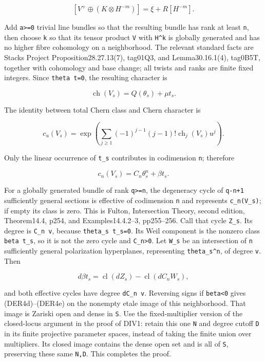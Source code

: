 \documentclass[11pt,a4paper]{article}
\theoremstyle{definition}
\begin{document}
\[
 [V^+\oplus (K\otimes H^{-m})]
 =\xi+R[H^{-m}].
\]

Add \texttt{a\textgreater{}=0} trivial line bundles so that the
resulting bundle has rank at least \texttt{n}, then choose \texttt{k} so
that its tensor product \texttt{V} with \texttt{H\^{}k} is globally
generated and has no higher fibre cohomology on a neighborhood. The
relevant standard facts are Stacks Project Proposition28.27.13(7),
tag01Q3, and Lemma30.16.1(4), tag0B5T, together with cohomology and base
change; all twists and ranks are finite fixed integers. Since
\texttt{theta\ t=0}, the resulting character is

\[
 \operatorname{ch}(V_s)=Q(\theta_s)+\mu t_s.
\]

The identity between total Chern class and Chern character is

\[
 c_u(V_s)=\exp\left(\sum_{j\ge1}(-1)^{j-1}(j-1)!
 \operatorname{ch}_j(V_s)u^j\right).
\]

Only the linear occurrence of \texttt{t\_s} contributes in codimension
\texttt{n}; therefore

\[
 c_n(V_s)=C_n\theta_s^n+\beta t_s.
\tag{DER4g}
\]

For a globally generated bundle of rank \texttt{q\textgreater{}=n}, the
degeneracy cycle of \texttt{q-n+1} sufficiently general sections is
effective of codimension \texttt{n} and represents \texttt{c\_n(V\_s)};
if empty its class is zero. This is Fulton, Intersection Theory, second
edition, Theorem14.4, p254, and Examples14.4.2--3, pp255--256. Call that
cycle \texttt{Z\_s}. Its degree is \texttt{C\_n\ v}, because
\texttt{theta\_s\ t\_s=0}. Its Weil component is the nonzero class
\texttt{beta\ t\_s}, so it is not the zero cycle and
\texttt{C\_n\textgreater{}0}. Let \texttt{W\_s} be an intersection of
\texttt{n} sufficiently general polarization hyperplanes, representing
\texttt{theta\_s\^{}n}, of degree \texttt{v}. Then

\[
 d\beta t_s=\operatorname{cl}(dZ_s)
             -\operatorname{cl}(dC_n W_s),
\]

and both effective cycles have degree \texttt{dC\_n\ v}. Reversing signs
if \texttt{beta\textless{}0} gives (DER4d)--(DER4e) on the nonempty
etale image of this neighborhood. That image is Zariski open and dense
in \texttt{S}. Use the fixed-multiplier version of the closed-locus
argument in the proof of DIV1: retain this one \texttt{N} and degree
cutoff \texttt{D} in its finite projective parameter spaces, instead of
taking the finite union over multipliers. Its closed image contains the
dense open set and is all of \texttt{S}, preserving these same
\texttt{N,D}. This completes the proof.
\end{document}
